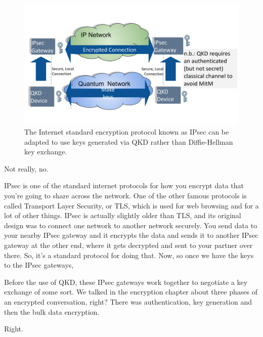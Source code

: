 \begin{figure}[t]
    \centering
    \includegraphics[width=1\textwidth]{lesson15/R2L15fig4.pdf}
    \caption[IPsec with QKD]{The Internet standard encryption protocol known as IPsec can be adapted to use keys generated via QKD rather than Diffie-Hellman key exchange.}
    \label{fig:15-4-ipsec-with-qkd}
\end{figure}

\mmm Not really, no.

\rrr IPsec is one of the standard internet protocols for how you encrypt data that you're going to share across the network. One of the other famous protocols is called Transport Layer Security, or TLS, which is used for web browsing and for a lot of other things. IPsec is actually slightly older than TLS, and its original design was to connect one network to another network securely. You send data to your nearby IPsec gateway and it encrypts the data and sends it to another IPsec gateway at the other end, where it gets decrypted and sent to your partner over there. So, it's a standard protocol for doing that. Now, so once we have the keys to the IPsec gateways,

Before the use of QKD, these IPsec gateways work together to negotiate a key exchange of some sort. We talked in the encryption chapter about three phases of an encrypted conversation, right? There was authentication, key generation and then the bulk data encryption.

\mmm Right.

